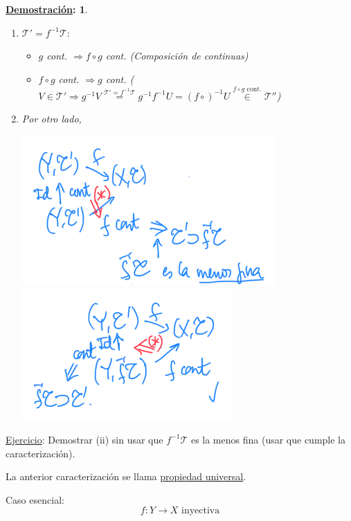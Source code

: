\documentclass[10pt,a4paper,openright]{book}
\theoremstyle{break}
\newtheorem*{demo}{\underline{Demostración}:}
\begin{document}
\begin{demo}
\begin{enumerate}
    \item $\mathcal{T}' = f^{-1}\mathcal{T}: $ 
    \begin{itemize}
        \item $g$ cont. $\Rightarrow f \circ g$ cont. (Composición de continuas)
        \item $f \circ g$ cont. $\Rightarrow g$ cont. ($V \in \mathcal{T}' \Rightarrow g^{-1}V \stackrel{\mathcal{T}' = f^{-1}\mathcal{T}}{=} g^{-1} f^{-1}U = \left( f \circ \right)^{-1} U \stackrel{f \circ g \text{ cont.}}{\in} \mathcal{T}''$)
    \end{itemize}

    \item Por otro lado,
    \begin{center}
        \includegraphics[scale=0.4]{images/dem_carac_img_inv_1} 
        \includegraphics[scale=0.4]{images/dem_carac_img_inv_2} 
    \end{center}
\end{enumerate}
\end{demo}

\underline{Ejercicio}: Demostrar (ii) sin usar que $f^{-1}\mathcal{T}$ es la menos fina (usar que cumple la caracterización).

La anterior caracterización se llama \underline{propiedad universal}.

Caso esencial: 
\[
\boxed{f: Y \rightarrow X \text{ inyectiva}} 
\]
\end{document}
